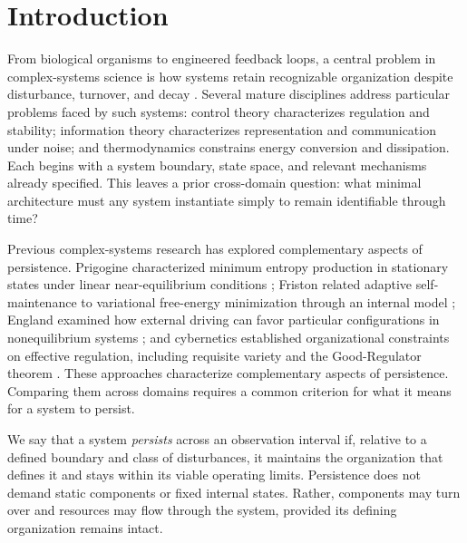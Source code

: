 \section{Introduction}
From biological organisms to engineered feedback loops, a central problem in complex-systems science is how systems retain recognizable organization despite disturbance, turnover, and decay \cite{schrodinger_what_1992}. Several mature disciplines address particular problems faced by such systems: control theory characterizes regulation and stability; information theory characterizes representation and communication under noise; and thermodynamics constrains energy conversion and dissipation. Each begins with a system boundary, state space, and relevant mechanisms already specified. This leaves a prior cross-domain question: what minimal architecture must any system instantiate simply to remain identifiable through time?

Previous complex-systems research has explored complementary aspects of persistence. Prigogine characterized minimum entropy production in stationary states under linear near-equilibrium conditions \cite{prigogine_introduction_1961}; Friston related adaptive self-maintenance to variational free-energy minimization through an internal model \cite{friston_free-energy_2010}; England examined how external driving can favor particular configurations in nonequilibrium systems \cite{england_dissipative_2015}; and cybernetics established organizational constraints on effective regulation, including requisite variety and the Good-Regulator theorem \cite{ashby_introduction_1956,conant_every_1970}. These approaches characterize complementary aspects of persistence. Comparing them across domains requires a common criterion for what it means for a system to persist.

We say that a system \emph{persists} across an observation interval if, relative to a defined boundary and class of disturbances, it maintains the organization that defines it and stays within its viable operating limits. Persistence does not demand static components or fixed internal states. Rather, components may turn over and resources may flow through the system, provided its defining organization remains intact.

